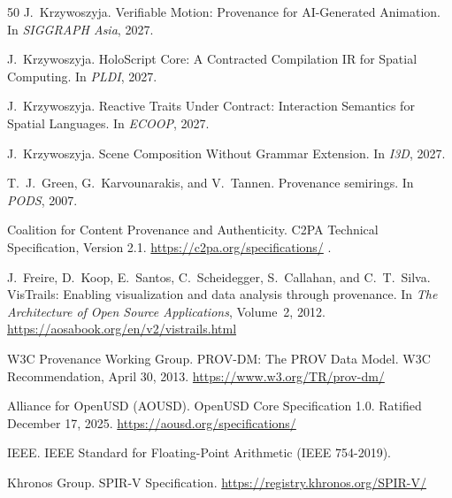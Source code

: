 \documentclass[sigconf,nonacm]{acmart}
\begin{document}
\begin{thebibliography}{50}
J.~Krzywoszyja.
\newblock Verifiable Motion: Provenance for AI-Generated Animation.
\newblock In \emph{SIGGRAPH Asia}, 2027.

J.~Krzywoszyja.
\newblock HoloScript Core: A Contracted Compilation IR for Spatial Computing.
\newblock In \emph{PLDI}, 2027.

J.~Krzywoszyja.
\newblock Reactive Traits Under Contract: Interaction Semantics for Spatial Languages.
\newblock In \emph{ECOOP}, 2027.

J.~Krzywoszyja.
\newblock Scene Composition Without Grammar Extension.
\newblock In \emph{I3D}, 2027.

T.~J.~Green, G.~Karvounarakis, and V.~Tannen.
\newblock Provenance semirings.
\newblock In \emph{PODS}, 2007.


Coalition for Content Provenance and Authenticity.
\newblock C2PA Technical Specification, Version 2.1.
\newblock \url{https://c2pa.org/specifications/}
.

J.~Freire, D.~Koop, E.~Santos, C.~Scheidegger, S.~Callahan, and C.~T.~Silva.
\newblock VisTrails: Enabling visualization and data analysis through provenance.
\newblock In \emph{The Architecture of Open Source Applications}, Volume~2, 2012.
\newblock \url{https://aosabook.org/en/v2/vistrails.html}

W3C Provenance Working Group.
\newblock PROV-DM: The PROV Data Model.
\newblock W3C Recommendation, April 30, 2013.
\newblock \url{https://www.w3.org/TR/prov-dm/}

Alliance for OpenUSD (AOUSD).
\newblock OpenUSD Core Specification 1.0.
\newblock Ratified December 17, 2025.
\newblock \url{https://aousd.org/specifications/}

IEEE.
\newblock IEEE Standard for Floating-Point Arithmetic (IEEE 754-2019).

Khronos Group.
\newblock SPIR-V Specification.
\newblock \url{https://registry.khronos.org/SPIR-V/}


\end{thebibliography}
\end{document}
